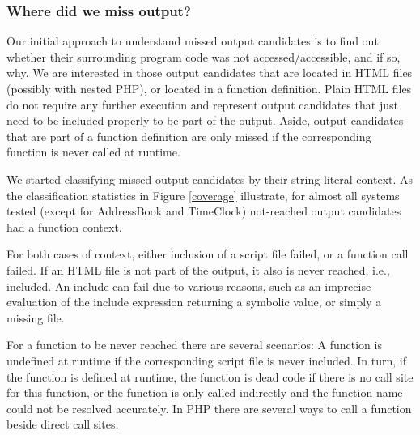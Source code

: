 \documentclass[sigconf]{acmart}
\begin{document}
\subsubsection{Where did we miss output?}\label{WhatLiteralsDidWeMiss?}
Our initial approach to understand missed output candidates is to find out
whether their surrounding program code was not accessed/accessible, and if so,
why. We are interested in those output candidates that are located in HTML
files (possibly with nested PHP), or located in a function definition. Plain
HTML files do not require any further execution and represent output candidates
that just need to be included properly to be part of the output. Aside, output
candidates that are part of a function definition are only missed if the
corresponding function is never called at runtime.

We started classifying missed output candidates by their string literal
context. As the classification statistics in Figure \ref{coverage} illustrate,
for almost all systems tested (except for \textsf{AddressBook} and
\textsf{TimeClock}) not-reached output candidates had a function context. 


For both cases of context, either inclusion of a script file failed, or a
function call failed. If an HTML file is not part of the output, it also is
never reached, i.e., included. An include can fail due to various reasons, such
as an imprecise evaluation of the include expression returning a symbolic
value, or simply a missing file.

For a function to be never reached there are several scenarios: A function is
undefined at runtime if the corresponding script file is never included. In
turn, if the function is defined at runtime, the function is dead
code if there is no call site for this function, or the function is only called
indirectly and the function name could not be resolved accurately. In PHP there
are several ways to call a function beside direct call sites. 
\end{document}

